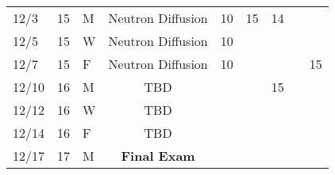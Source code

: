 \documentclass[11pt, a4paper]{article}
\begin{document}
\begin{table}[h]
\begin{center}
\begin{tabular}{lllcccccc}
12/3 & 15 & M & Neutron Diffusion & 10 & 15 & 14 &  &  \\
12/5 & 15 & W & Neutron Diffusion  &  10 &  &  &  &  \\
12/7 & 15 & F & Neutron Diffusion  & 10 &  &  &  & 15 \\
12/10 & 16 & M &  TBD  &  &  & 15 &  &  \\
12/12 & 16 & W & TBD  &  &  &  &  &  \\
12/14 & 16 & F & TBD  &  &  &  &  &  \\
12/17 & 17 & M & \textbf{Final Exam} &   &  &  &  &  \\
\end{tabular}
\end{center}
\end{table}
\FloatBarrier



\end{document}
